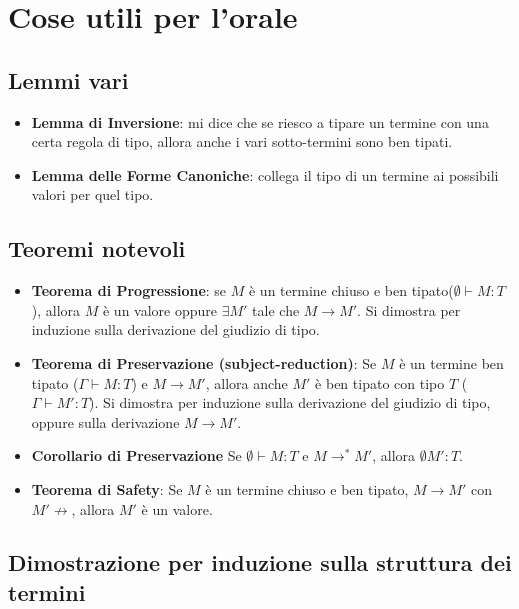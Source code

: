 \chapter{Cose utili per l'orale}

\section{Lemmi vari}

\begin{itemize}
	\item \textbf{Lemma di Inversione}: mi dice che se riesco a tipare un termine con una certa regola di tipo, allora anche i vari sotto-termini sono ben tipati.
	\item \textbf{Lemma delle Forme Canoniche}: collega il tipo di un termine ai possibili valori per quel tipo.
\end{itemize}

\section{Teoremi notevoli}

\begin{itemize}
	\item \textbf{Teorema di Progressione}: se $M$ è un termine chiuso e ben tipato($\emptyset \vdash M :T $), allora $M$ è un valore oppure $\exists M'$ tale che $M \to M'$. Si dimostra per induzione sulla derivazione del giudizio di tipo.
	\item \textbf{Teorema di Preservazione (subject-reduction)}: Se $M$ è un termine ben tipato ($\Gamma \vdash M :T $) e $M \to M'$, allora anche $M'$ è ben tipato con tipo $T$ ($\Gamma \vdash M' : T$). Si dimostra per induzione sulla derivazione del giudizio di tipo, oppure sulla derivazione $M \to M'$.
	\item \textbf{Corollario di Preservazione} Se $\emptyset \vdash M : T$ e $M \to^* M'$, allora $\emptyset M':T$.
	\item \textbf{Teorema di Safety}: Se $M$ è un termine chiuso e ben tipato, $M \to M'$ con $M' \not\to$, allora $M'$ è un valore.
\end{itemize}

\section{Dimostrazione per induzione sulla struttura dei termini}

